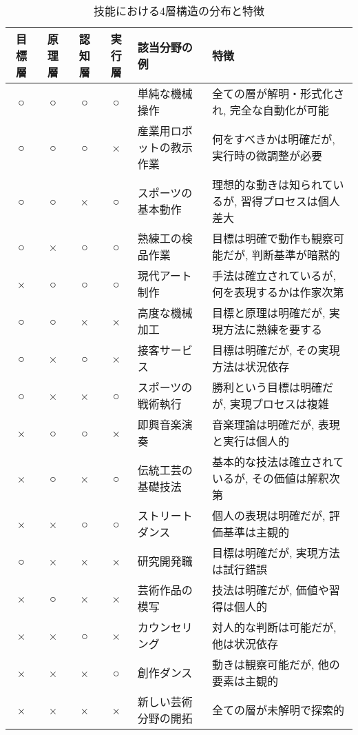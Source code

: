 \begin{table}[htbp]
    \setlength{\tabcolsep}{4pt}
    \small
    \renewcommand{\arraystretch}{1.4}
    \centering
    \begin{tabular}{c|c|c|c|p{3.5cm}|p{4.5cm}}
        \hline
        目標層 & 原理層 & 認知層 & 実行層 & 該当分野の例 & 特徴 \\ \hline\hline
        ○ & ○ & ○ & ○ & 単純な機械操作 & 全ての層が解明・形式化され, 完全な自動化が可能 \\ \hline
        ○ & ○ & ○ & × & 産業用ロボットの教示作業 & 何をすべきかは明確だが, 実行時の微調整が必要 \\ \hline
        ○ & ○ & × & ○ & スポーツの基本動作 & 理想的な動きは知られているが, 習得プロセスは個人差大 \\ \hline
        ○ & × & ○ & ○ & 熟練工の検品作業 & 目標は明確で動作も観察可能だが, 判断基準が暗黙的 \\ \hline
        × & ○ & ○ & ○ & 現代アート制作 & 手法は確立されているが, 何を表現するかは作家次第 \\ \hline
        ○ & ○ & × & × & 高度な機械加工 & 目標と原理は明確だが, 実現方法に熟練を要する \\ \hline
        ○ & × & ○ & × & 接客サービス & 目標は明確だが, その実現方法は状況依存 \\ \hline
        ○ & × & × & ○ & スポーツの戦術執行 & 勝利という目標は明確だが, 実現プロセスは複雑 \\ \hline
        × & ○ & ○ & × & 即興音楽演奏 & 音楽理論は明確だが, 表現と実行は個人的 \\ \hline
        × & ○ & × & ○ & 伝統工芸の基礎技法 & 基本的な技法は確立されているが, その価値は解釈次第 \\ \hline
        × & × & ○ & ○ & ストリートダンス & 個人の表現は明確だが, 評価基準は主観的 \\ \hline
        ○ & × & × & × & 研究開発職 & 目標は明確だが, 実現方法は試行錯誤 \\ \hline
        × & ○ & × & × & 芸術作品の模写 & 技法は明確だが, 価値や習得は個人的 \\ \hline
        × & × & ○ & × & カウンセリング & 対人的な判断は可能だが, 他は状況依存 \\ \hline
        × & × & × & ○ & 創作ダンス & 動きは観察可能だが, 他の要素は主観的 \\ \hline
        × & × & × & × & 新しい芸術分野の開拓 & 全ての層が未解明で探索的\\
        \hline
    \end{tabular}
    \caption{技能における4層構造の分布と特徴}
    \label{table_skill_hierarchy}
\end{table}

